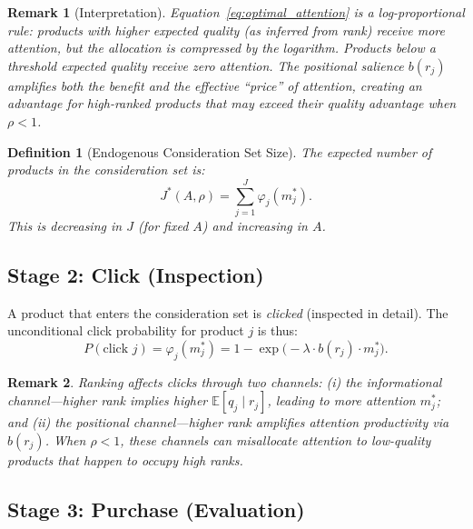 \documentclass[12pt]{article}
\newtheorem{definition}{Definition}
\newtheorem{remark}{Remark}
\begin{document}
\begin{remark}[Interpretation]
Equation~\eqref{eq:optimal_attention} is a \emph{log-proportional} rule: products with higher expected quality (as inferred from rank) receive more attention, but the allocation is compressed by the logarithm. Products below a threshold expected quality receive zero attention. The positional salience $b(r_j)$ amplifies both the benefit and the effective ``price'' of attention, creating an advantage for high-ranked products that may exceed their quality advantage when $\rho < 1$.
\end{remark}

\begin{definition}[Endogenous Consideration Set Size]\label{def:consideration_size}
The expected number of products in the consideration set is:
\begin{equation}\label{eq:J_star}
    J^*(A, \rho) = \sum_{j=1}^{J} \varphi_j(m_j^*).
\end{equation}
This is decreasing in $J$ (for fixed $A$) and increasing in $A$.
\end{definition}

\subsection{Stage 2: Click (Inspection)}\label{sec:click}

A product that enters the consideration set is \emph{clicked} (inspected in detail). The unconditional click probability for product $j$ is thus:
\begin{equation}\label{eq:click}
    P(\text{click } j) = \varphi_j(m_j^*) = 1 - \exp\!\big(-\lambda \cdot b(r_j) \cdot m_j^*\big).
\end{equation}

\begin{remark}
Ranking affects clicks through two channels: (i) the \emph{informational channel}---higher rank implies higher $\mathbb{E}[q_j \mid r_j]$, leading to more attention $m_j^*$; and (ii) the \emph{positional channel}---higher rank amplifies attention productivity via $b(r_j)$. When $\rho < 1$, these channels can misallocate attention to low-quality products that happen to occupy high ranks.
\end{remark}

\subsection{Stage 3: Purchase (Evaluation)}\label{sec:purchase}
\end{document}
